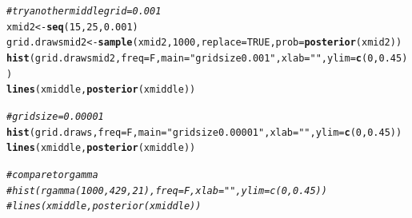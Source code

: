 \documentclass[12pt]{article}\usepackage[]{graphicx}\usepackage[]{color}
\makeatletter
\newcommand{\hlnum}[1]{\textcolor[rgb]{0.686,0.059,0.569}{#1}}%
\newcommand{\hlstr}[1]{\textcolor[rgb]{0.192,0.494,0.8}{#1}}%
\newcommand{\hlcom}[1]{\textcolor[rgb]{0.678,0.584,0.686}{\textit{#1}}}%
\newcommand{\hlstd}[1]{\textcolor[rgb]{0.345,0.345,0.345}{#1}}%
\newcommand{\hlkwb}[1]{\textcolor[rgb]{0.69,0.353,0.396}{#1}}%
\newcommand{\hlkwc}[1]{\textcolor[rgb]{0.333,0.667,0.333}{#1}}%
\newcommand{\hlkwd}[1]{\textcolor[rgb]{0.737,0.353,0.396}{\textbf{#1}}}%
\newenvironment{kframe}{%
 \def\at@end@of@kframe{}%
 \ifinner\ifhmode%
  \def\at@end@of@kframe{\end{minipage}}%
  \begin{minipage}{\columnwidth}%
 \fi\fi%
 \def\FrameCommand##1{\hskip\@totalleftmargin \hskip-\fboxsep
 \colorbox{shadecolor}{##1}\hskip-\fboxsep
     \hskip-\linewidth \hskip-\@totalleftmargin \hskip\columnwidth}%
 \MakeFramed {\advance\hsize-\width
   \@totalleftmargin\z@ \linewidth\hsize
   \@setminipage}}%
 {\par\unskip\endMakeFramed%
 \at@end@of@kframe}
\newenvironment{knitrout}{}{} %
\makeatother
\begin{document}
\begin{knitrout}
\begin{kframe}
\begin{alltt}
\hlcom{#try another middle grid=0.001}
\hlstd{xmid2} \hlkwb{<-} \hlkwd{seq}\hlstd{(}\hlnum{15}\hlstd{,} \hlnum{25}\hlstd{,} \hlnum{0.001}\hlstd{)}
\hlstd{grid.drawsmid2} \hlkwb{<-} \hlkwd{sample}\hlstd{(xmid2,} \hlnum{1000}\hlstd{,} \hlkwc{replace}\hlstd{=}\hlnum{TRUE}\hlstd{,} \hlkwc{prob}\hlstd{=}\hlkwd{posterior}\hlstd{(xmid2))}
\hlkwd{hist}\hlstd{(grid.drawsmid2,} \hlkwc{freq}\hlstd{=F,} \hlkwc{main}\hlstd{=}\hlstr{"grid size 0.001"}\hlstd{,} \hlkwc{xlab}\hlstd{=}\hlstr{""}\hlstd{,} \hlkwc{ylim}\hlstd{=}\hlkwd{c}\hlstd{(}\hlnum{0}\hlstd{,} \hlnum{0.45}\hlstd{))}
\hlkwd{lines}\hlstd{(xmiddle,} \hlkwd{posterior}\hlstd{(xmiddle))}

\hlcom{#grid size=0.00001}
\hlkwd{hist}\hlstd{(grid.draws,} \hlkwc{freq}\hlstd{=F,} \hlkwc{main}\hlstd{=}\hlstr{"grid size 0.00001"}\hlstd{,} \hlkwc{xlab}\hlstd{=}\hlstr{""}\hlstd{,} \hlkwc{ylim}\hlstd{=}\hlkwd{c}\hlstd{(}\hlnum{0}\hlstd{,} \hlnum{0.45}\hlstd{))}
\hlkwd{lines}\hlstd{(xmiddle,} \hlkwd{posterior}\hlstd{(xmiddle))}

\hlcom{#compare to rgamma}
\hlcom{#hist(rgamma(1000, 429, 21), freq=F, xlab="", ylim=c(0, 0.45))}
\hlcom{#lines(xmiddle, posterior(xmiddle))}
\end{alltt}
\end{kframe}
\end{knitrout}
\end{document}
